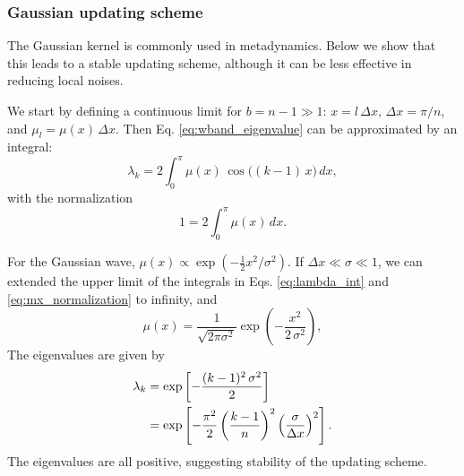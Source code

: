 \documentclass[reprint]{revtex4-1}
\begin{document}
\subsubsection{Gaussian updating scheme}


The Gaussian kernel is commonly
used in metadynamics.
%
Below we show that this
leads to a stable updating scheme,
although it can be less effective
in reducing local noises.



We start by defining
a continuous limit
for $b = n - 1 \gg 1$:
$x = l \, \Delta x$,
$\Delta x = \pi/n$,
and
$\mu_l = \mu(x) \, \Delta x$.
%
Then
Eq. \eqref{eq:wband_eigenvalue}
can be approximated by an integral:
%
\begin{equation}
\lambda_k
=
2 \int_0^\pi
  \mu(x) \, \cos \bigl( (k-1) \, x \bigr) \, dx,
\label{eq:lambda_int}
\end{equation}
%
with the normalization
%
\begin{equation}
1 = 2 \int_0^\pi \mu(x) \, dx.
\label{eq:mx_normalization}
\end{equation}



For the Gaussian wave,
$\mu(x) \propto \exp(-\frac{1}{2} x^2/\sigma^2)$.
%
If $\Delta x \ll \sigma \ll 1$,
we can extended
the upper limit of the integrals
in Eqs. \eqref{eq:lambda_int}
and \eqref{eq:mx_normalization}
to infinity, and
%
\begin{equation}
\mu(x)
=
\frac{            1            }
     { \sqrt{ 2 \pi \sigma^2 } }
%
\exp\left(
      -\frac{       x^2     }
            { 2 \, \sigma^2 }
    \right),
\end{equation}
%
%
The eigenvalues are given by
%
\begin{align}
\lambda_k
&=
\exp\left[
      -\frac{ (k - 1)^2 \, \sigma^2 }
            {           2           }
    \right]
\notag
\\
&=
\exp\left[
      -\frac{ \pi^2 }{ 2 }
      \left(
        \frac{ k - 1 }
             {   n   }
      \right)^2
      \left(
        \frac{  \sigma }
             { \Delta x }
      \right)^2
    \right]
.
\label{eq:lambda_Gaussian}
\end{align}
%
The eigenvalues are all positive,
suggesting stability of the updating scheme.
\end{document}
